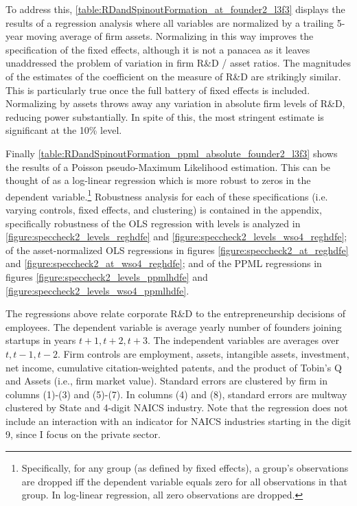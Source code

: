 \documentclass[11pt,english]{article}
\begin{document}
To address this, \autoref{table:RDandSpinoutFormation_at_founder2_l3f3} displays the results of a regression analysis where all variables are normalized by a trailing 5-year moving average of firm assets. Normalizing in this way improves the specification of the fixed effects, although it is not a panacea as it leaves unaddressed the problem of variation in firm R\&D / asset ratios. The magnitudes of the estimates of the coefficient on the measure of R\&D are strikingly similar. This is particularly true once the full battery of fixed effects is included. Normalizing by assets throws away any variation in absolute firm levels of R\&D, reducing power substantially. In spite of this, the most stringent estimate is significant at the 10\% level.

Finally \autoref{table:RDandSpinoutFormation_ppml_absolute_founder2_l3f3} shows the results of a Poisson pseudo-Maximum Likelihood estimation. This can be thought of as a log-linear regression which is more robust to zeros in the dependent variable.\footnote{Specifically, for any group (as defined by fixed effects), a group's observations are dropped iff the dependent variable equals zero for all observations in that group. In log-linear regression, all zero observations are dropped.} Robustness analysis for each of these specifications (i.e. varying controls, fixed effects, and clustering) is contained in the appendix, specifically robustness of the OLS regression with levels is analyzed in \ref{figure:speccheck2_levels_reghdfe} and  \ref{figure:speccheck2_levels_wso4_reghdfe}; of the asset-normalized OLS regressions in figures \ref{figure:speccheck2_at_reghdfe} and \ref{figure:speccheck2_at_wso4_reghdfe}; and of the PPML regressions in figures \ref{figure:speccheck2_levels_ppmlhdfe} and \ref{figure:speccheck2_levels_wso4_ppmlhdfe}.


\begin{table}[!htb]
	\scriptsize
	\centering
	
	\caption{The regressions above relate corporate R\&D to the entrepreneurship decisions of employees. The dependent variable is average yearly number of founders joining startups in years $t+1,t+2,t+3$. The independent variables are averages over $t,t-1,t-2$. Firm controls are employment, assets, intangible assets, investment, net income, cumulative citation-weighted patents, and the product of Tobin's Q and Assets (i.e., firm market value). Standard errors are clustered by firm in columns (1)-(3) and (5)-(7). In columns (4) and (8), standard errors are multway clustered by State and 4-digit NAICS industry. Note that the regression does not include an interaction with an indicator for NAICS industries starting in the digit 9, since I focus on the private sector.}
	\label{table:RDandSpinoutFormation_absolute_founder2_l3f3}
\end{table}
\end{document}

